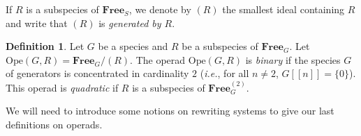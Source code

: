 \documentclass[a4paper]{article}
\theoremstyle{definition}
\newtheorem{definition}{Definition}
\newcommand{\K}{\mathbb{K}}
\newcommand{\Ope}{\mathrm{Ope}}
\newcommand{\FreeOp}{\mathbf{Free}}
\begin{document}
If $R$ is a subspecies of $\FreeOp_S$, we denote by $(R)$ the smallest ideal
containing $R$ and write that $(R)$ is \textit{generated by $R$}.


\begin{definition}
Let $G$ be a species and $R$ be a subspecies of $\FreeOp_G$. Let
$\Ope(G,R) = \FreeOp_G/(R)$. The operad $\Ope(G,R)$ is \textit{binary} if the species $G$
of generators is concentrated in cardinality $2$ ({\em i.e.}, for all $n \ne 2$, $G[[n]] =
\{0\}$). This operad is \textit{quadratic} if $R$ is a subspecies of
$\FreeOp_G^{(2)}$.
\end{definition}

We will need to introduce some notions on rewriting systems to give 
our last definitions on operads.



\end{document}

